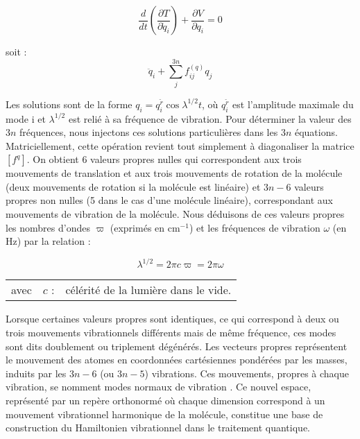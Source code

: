 \documentclass[12pt,a4paper]{book}
\begin{document}
\begin{equation}
\frac{d}{dt}\left(\frac{\partial T}{\partial \dot{q}_i}\right) + \frac{\partial V}{\partial q_i} = 0
\end{equation}

\noindent soit : 
\begin{equation}
\ddot{q}_i + \sum^{3n}_j f^{(q)}_{ij} q_j
\end{equation}

Les solutions sont de la forme $q_i = q_i^{\check{r}} \cos \lambda^{1/2} t$, où $q_i^{\check{r}}$ est l'amplitude maximale du mode i et $\lambda^{1/2}$ est relié à sa fréquence de vibration. Pour déterminer la valeur des $3n$ fréquences, nous injectons ces solutions particulières dans les $3n$ équations. Matriciellement, cette opération revient tout simplement à diagonaliser la matrice $\left[ f^q\right]$.
On obtient 6 valeurs propres nulles qui correspondent aux trois mouvements de translation et aux trois mouvements de rotation de la molécule (deux mouvements de rotation si la molécule est linéaire) et $3n-6$ valeurs propres non nulles (5 dans le cas d'une molécule linéaire), correspondant aux mouvements de vibration de la molécule. Nous déduisons de ces valeurs propres les nombres d'ondes $\varpi$ (exprimés en cm$^{-1}$) et les fréquences de vibration $\omega$ (en Hz) par la relation :

\begin{equation}
\lambda^{1/2} = 2\pi c\varpi = 2\pi\omega
\label{varpi}
\end{equation}
\begin{flushleft}
	\begin{tabular}{@{}lrp{10cm}}
		avec & $c$ : & célérité de la lumière dans le vide. 
	\end{tabular}
\end{flushleft}

Lorsque certaines valeurs propres sont identiques, ce qui correspond à deux ou trois mouvements vibrationnels différents mais de même fréquence, ces modes sont dits doublement ou triplement dégénérés.
Les vecteurs propres représentent le mouvement des atomes en coordonnées cartésiennes pondérées par les masses, induits par les $3n-6$ (ou $3n-5$) vibrations. Ces mouvements, propres à chaque vibration, se nomment \og modes normaux de vibration \fg. Ce nouvel espace, représenté par un repère orthonormé où chaque dimension correspond à un mouvement vibrationnel harmonique de la molécule, constitue une base de construction du Hamiltonien vibrationnel dans le traitement quantique.
\end{document}
